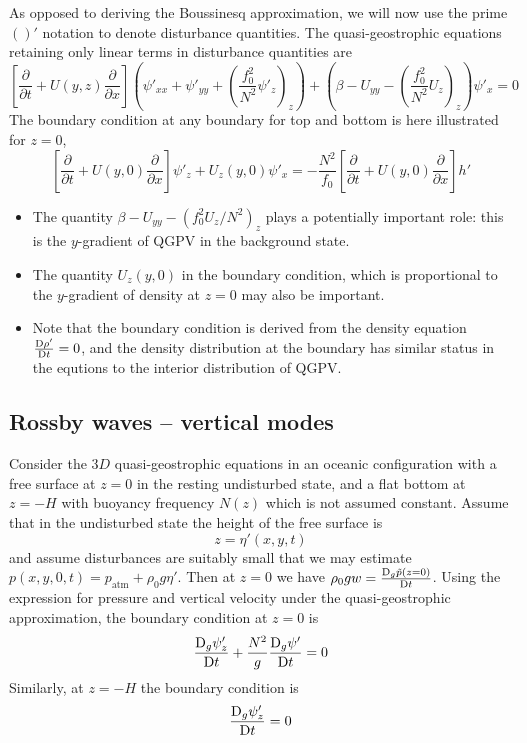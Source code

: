 \documentclass{jknotes}
\begin{document}
As opposed to deriving the Boussinesq approximation, we will now use the prime
$()'$ notation to denote disturbance quantities. The quasi-geostrophic
equations retaining only linear terms in disturbance quantities are
\begin{equation}
	\left[ \frac{\partial}{\partial t} + U(y,z) \frac{\partial}{\partial
	x}\right](\psi'_{xx} + \psi'_{yy} + (\frac{f_0^2}{N^2} \psi'_z)_z) +
	(\beta - U_{yy} - (\frac{f_0^2}{N^2} U_z)_z)\psi'_x = 0
\end{equation}
The boundary condition at any boundary for top and bottom is here  illustrated
for $z=0$,
\begin{equation}
	\left[\frac{\partial}{\partial t} + U(y,0) \frac{\partial}{\partial
		x}\right] \psi'_z + U_z(y,0) \psi'_x = -\frac{N^2}{f_0} \left[
			\frac{\partial}{\partial t} + U(y,0) \frac{\partial}{\partial x}
		\right] h'
\end{equation}

\begin{itemize}
	\item The quantity $\beta - U_{yy} - (f_0^2 U_z / N^2)_z$ plays a
		potentially important role: this is the $y$-gradient of QGPV in the
		background state.
	\item The quantity $U_z(y,0)$ in the boundary condition, which is
		proportional to the $y$-gradient of density at $z=0$ may also be
		important.
	\item Note that the boundary condition is derived from the density
		equation $\frac{\mathrm{D} \rho'}{\mathrm{D} t} = 0$, and the density
		distribution at the boundary has similar status in the equtions to the
		interior distribution of QGPV.
\end{itemize}

\subsection{Rossby waves -- vertical modes}
Consider the $3D$ quasi-geostrophic equations in an oceanic configuration with
a free surface at $z=0$ in the resting undisturbed state, and a flat bottom at
$z = -H$ with buoyancy frequency $N(z)$ which is not assumed constant. Assume
that in the undisturbed state the height of the free surface is
\begin{equation}
	z = \eta'(x,y,t)
\end{equation}
and assume disturbances are suitably small that we may estimate $p(x,y,0,t) =
p_{\text{atm}} + \rho_0 g \eta'$. Then at $z=0$ we have $\rho_0 g w =
\frac{\mathrm{D}_g \tilde{p}(z=0)}{\mathrm{D} t}$. Using the expression for pressure
and vertical velocity under the quasi-geostrophic approximation, the boundary
condition at $z=0$ is
\begin{equation}
	\frac{\mathrm{D}_g \psi'_z}{\mathrm{D} t} + \frac{N^2}{g} \frac{\mathrm{D}_g
	\psi'}{\mathrm{D} t} = 0
\end{equation}
Similarly, at $z=-H$ the boundary condition is
\begin{equation}
	\frac{\mathrm{D}_g \psi'_z}{\mathrm{D} t} = 0 
\end{equation}
\end{document}
